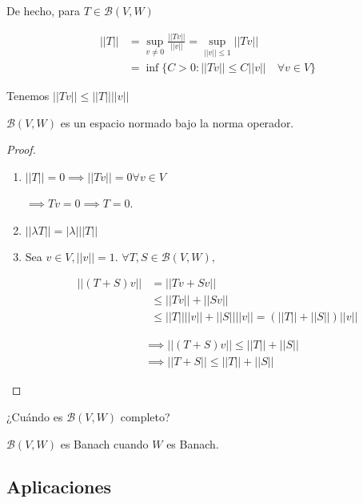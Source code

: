 \documentclass[../Apunte.tex]{subfiles}
\begin{document}
De hecho, para $T\in \mathcal{B}(V,W)$

\begin{align*}
    ||T||&=\sup_{v\neq 0} \frac{||Tv||}{||v||}=\sup_{||v||\leq 1} ||Tv||\\
    &=\inf \{C>0:||Tv||\leq C||v||\quad \forall v\in V\}
\end{align*}

Tenemos $||Tv||\leq ||T||||v||$

\begin{ftheorem}
    $\mathcal{B}(V,W)$ es un espacio normado bajo la norma operador.
\end{ftheorem}

\begin{proof}
    \begin{enumerate}
        \item $||T||=0\implies ||Tv||=0\forall v\in V$
         
        $\implies Tv=0\implies T=0$.

        \item $||\lambda T||=|\lambda| ||T||$

        \item Sea $v\in V,||v||=1$. $\forall T,S\in\mathcal{B}(V,W),$
        
        \begin{align*}||(T+S)v||&=||Tv+Sv||\\
        &\leq ||Tv||+||Sv||\\
        &\leq ||T|| ||v||+||S|| ||v||=(||T||+||S||)||v||\end{align*}

    \begin{align*}
        &\implies ||(T+S)v||\leq ||T||+||S||\\
        &\implies ||T+S||\leq ||T||+||S||
    \end{align*}
    \end{enumerate}
\end{proof}

    ¿Cuándo es $\mathcal{B}(V,W)$ completo?

    \begin{ftheorem}
        $\mathcal{B}(V,W)$ es Banach cuando $W$ es Banach.
    \end{ftheorem}

    \subsection{Aplicaciones}
\end{document}
